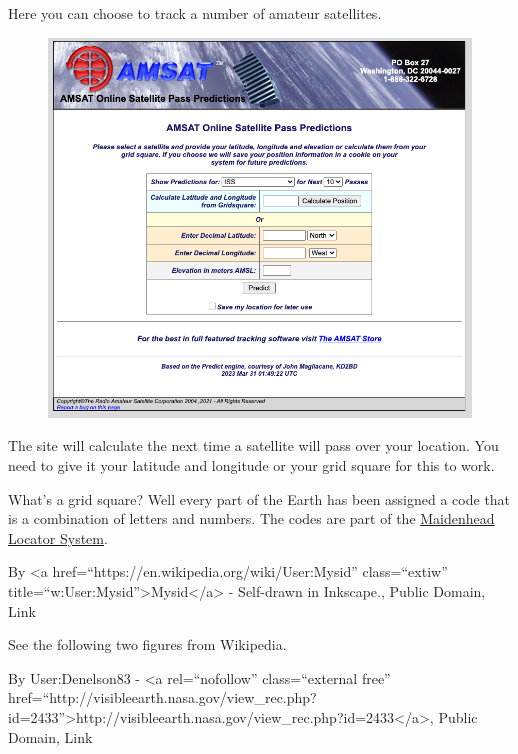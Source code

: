 \documentclass[
  letterpaper,
  DIV=11,
  numbers=noendperiod]{scrreport}
\begin{document}
Here you can choose to track a number of amateur satellites.

\begin{figure}

{\centering \includegraphics{include/img/amsat-track.png}

}

\end{figure}

The site will calculate the next time a satellite will pass over your
location. You need to give it your latitude and longitude or your grid
square for this to work.

What's a grid square? Well every part of the Earth has been assigned a
code that is a combination of letters and numbers. The codes are part of
the
\href{https://en.wikipedia.org/wiki/Maidenhead_Locator_System}{Maidenhead
Locator System}.

By \textless a href=``https://en.wikipedia.org/wiki/User:Mysid''
class=``extiw''
title=``w:User:Mysid''\textgreater Mysid\textless/a\textgreater{} -
Self-drawn in Inkscape., Public Domain, Link

See the following two figures from Wikipedia.

By User:Denelson83 - \textless a rel=``nofollow'' class=``external
free''
href=``http://visibleearth.nasa.gov/view\_rec.php?id=2433''\textgreater http://visibleearth.nasa.gov/view\_rec.php?id=2433\textless/a\textgreater,
Public Domain, Link
\end{document}
